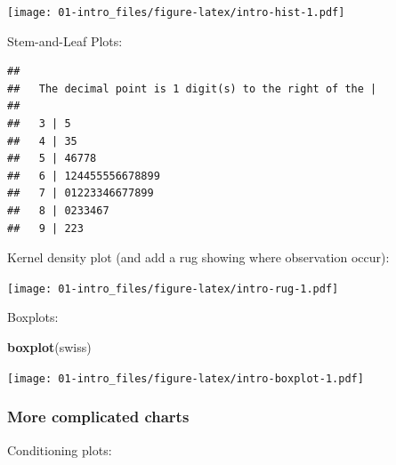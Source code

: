\documentclass[]{book}
\newenvironment{Shaded}{\begin{snugshade}}{\end{snugshade}}
\newcommand{\KeywordTok}[1]{\textcolor[rgb]{0.13,0.29,0.53}{\textbf{{#1}}}}
\newcommand{\DecValTok}[1]{\textcolor[rgb]{0.00,0.00,0.81}{{#1}}}
\newcommand{\StringTok}[1]{\textcolor[rgb]{0.31,0.60,0.02}{{#1}}}
\newcommand{\NormalTok}[1]{{#1}}
\theoremstyle{definition}
\theoremstyle{definition}
\theoremstyle{remark}
\begin{document}
\texttt{[image: 01-intro\_files/figure-latex/intro-hist-1.pdf]}

Stem-and-Leaf Plots:

\begin{Shaded}
\end{Shaded}

\begin{verbatim}
## 
##   The decimal point is 1 digit(s) to the right of the |
## 
##   3 | 5
##   4 | 35
##   5 | 46778
##   6 | 124455556678899
##   7 | 01223346677899
##   8 | 0233467
##   9 | 223
\end{verbatim}

Kernel density plot (and add a rug showing where observation occur):

\begin{Shaded}
\end{Shaded}

\texttt{[image: 01-intro\_files/figure-latex/intro-rug-1.pdf]}

Boxplots:

\begin{Shaded}
\begin{Highlighting}[]
\KeywordTok{boxplot}\NormalTok{(swiss)}
\end{Highlighting}
\end{Shaded}

\texttt{[image: 01-intro\_files/figure-latex/intro-boxplot-1.pdf]}

\subsubsection{More complicated charts}\label{more-complicated-charts}

Conditioning plots:

\begin{Shaded}
\end{Shaded}
\end{document}

